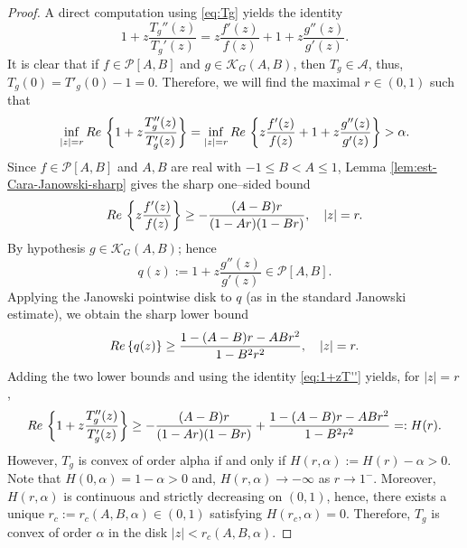 \documentclass[12pt,a4paper]{amsart}
\numberwithin{equation}{section}
\theoremstyle{remark}
\begin{document}
\begin{proof}
A direct computation using \eqref{eq:Tg} yields the identity
\begin{equation}\label{eq:1+zT''}
1+z\frac{T_g''(z)}{T_g'(z)}
= z\frac{f'(z)}{f(z)} + 1+z\frac{g''(z)}{g'(z)}.
\end{equation}
It is clear that if $f\in\mathcal{P}[A,B]$ and $g\in\mathcal{K}_G(A,B)$, then $T_g\in\mathcal{A}$, thus, $T_g(0)=T'_g(0)-1=0$. Therefore, 
we will find the maximal $r\in(0,1)$ such that
\begin{equation*}
\inf_{|z|=r}{\rm Re}\,\left\{1+z\frac{T_g''(z)}{T_g'(z)}\right\}=\inf_{|z|=r}{\rm Re}\,\left\{ z\frac{f'(z)}{f(z)} + 1+z\frac{g''(z)}{g'(z)}\right\}>\alpha.
\end{equation*}
Since \(f\in\mathcal P[A,B]\) and \(A,B\) are real with \(-1\le B<A\le1\), Lemma \ref{lem:est-Cara-Janowski-sharp} gives the sharp one–sided bound
\[
{\rm Re}\,\left\{ z\frac{f'(z)}{f(z)}\right\} \ge -\frac{(A-B)r}{(1-A r)(1-B r)}, \quad |z|=r.
\]
By hypothesis \(g\in\mathcal K_G(A,B)\); hence
\begin{equation*}
q(z):=1+z\frac{g''(z)}{g'(z)}\in\mathcal{P}[A,B].
\end{equation*}
Applying the Janowski pointwise disk to \(q\) (as in the standard Janowski estimate), we obtain the sharp lower bound
\[
{\rm Re}\,\{q(z)\} \ge \frac{1-(A-B)r-AB r^2}{1-B^2 r^2},\quad |z|=r.
\]
Adding the two lower bounds and using the identity \eqref{eq:1+zT''} yields, for \(|z|=r\),
\[
{\rm Re}\,\left\{1+z\frac{T_g''(z)}{T_g'(z)}\right\}
\ge -\frac{(A-B)r}{(1-A r)(1-B r)} + \frac{1-(A-B)r-AB r^2}{1-B^2 r^2}=:H(r).
\]
However, $T_g$ is convex of order alpha if and only if $H(r,\alpha):=H(r)-\alpha>0$.
Note that \(H(0,\alpha)=1-\alpha>0\) and, \(H(r,\alpha)\to -\infty\) as \(r\to1^{-}\). 
Moreover, \(H(r,\alpha)\) is continuous and strictly decreasing on \((0,1)\), hence, there exists a unique \(r_c:=r_c(A,B,\alpha)\in(0,1)\) satisfying \(H(r_c,\alpha)=0\). Therefore, $T_g$ is convex of order $\alpha$ in the disk $|z|<r_c(A,B,\alpha)$.


\end{proof}
\end{document}
